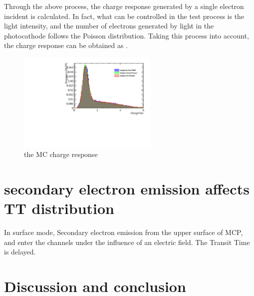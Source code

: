 \documentclass{article}
\begin{document}
Through the above process, the charge response generated by a single electron incident is calculated. 
In fact, what can be controlled in the test process is the light intensity, 
and the number of electrons generated by light in the photocathode follows the Poisson distribution. 
Taking this process into account, the charge response can be obtained as .
\begin{figure}[ht]
    \centering
    \includegraphics[width=0.6\textwidth]{pic/convolution.pdf}
    \caption{the MC charge response}\label{fig:convolution}
\end{figure}

\section{secondary electron emission affects TT distribution}\label{sec:TT}
In surface mode, Secondary electron emission from the upper surface of MCP,
and enter the channels under the influence of an electric field.
The Transit Time is delayed.

\section{Discussion and conclusion}\label{sec:conclusion}

\newpage


\end{document}
